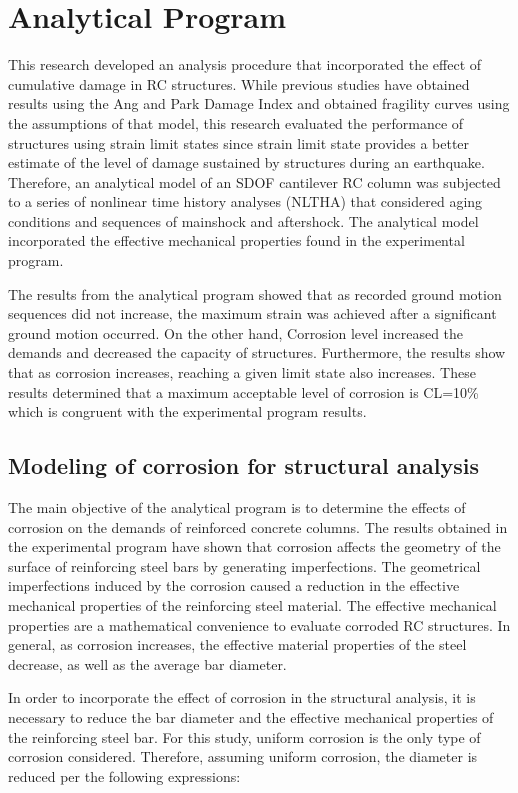 \chapter{Analytical Program}
\label{chap-five}
This research developed an analysis procedure that incorporated the effect of cumulative damage in RC structures. While previous studies have obtained results using the Ang and Park Damage Index and obtained fragility curves using the assumptions of that model, this research evaluated the performance of structures using strain limit states since strain limit state provides a better estimate of the level of damage sustained by structures during an earthquake. Therefore, an analytical model of an SDOF cantilever RC column was subjected to a series of nonlinear time history analyses (NLTHA) that considered aging conditions and sequences of mainshock and aftershock. The analytical model incorporated the effective mechanical properties found in the experimental program. 

The results from the analytical program showed that as recorded ground motion sequences did not increase, the maximum strain was achieved after a significant ground motion occurred. On the other hand, Corrosion level increased the demands and decreased the capacity of structures. Furthermore, the results show that as corrosion increases, reaching a given limit state also increases. These results determined that a maximum acceptable level of corrosion is CL=10\% which is congruent with the experimental program results.

\section{Modeling of corrosion for structural analysis}

The main objective of the analytical program is to determine the effects of corrosion on the demands of reinforced concrete columns. The results obtained in the experimental program have shown that corrosion affects the geometry of the surface of reinforcing steel bars by generating imperfections. The geometrical imperfections induced by the corrosion caused a reduction in the effective mechanical properties of the reinforcing steel material. The effective mechanical properties are a mathematical convenience to evaluate corroded RC structures. In general, as corrosion increases, the effective material properties of the steel decrease, as well as the average bar diameter.

In order to incorporate the effect of corrosion in the structural analysis, it is necessary to reduce the bar diameter and the effective mechanical properties of the reinforcing steel bar. For this study, uniform corrosion is the only type of corrosion considered. Therefore, assuming uniform corrosion, the diameter is reduced per the following expressions:

